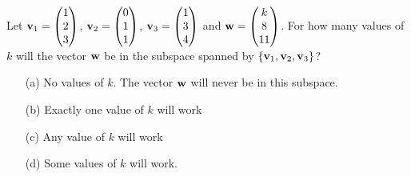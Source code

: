 \begin{problem}
    Let ${\bf v}_1 = \begin{pmatrix} 1 \\ 2 \\ 3 \end{pmatrix}$, ${\bf v}_2 = \begin{pmatrix} 0 \\
        1 \\ 1 \end{pmatrix}$, ${\bf v}_3 = \begin{pmatrix} 1 \\ 3 \\ 4 \end{pmatrix}$ and
            ${\bf w} = \begin{pmatrix} k \\ 8 \\ 11\end{pmatrix}$.  For how many values of $k$
                will the vector ${\bf w}$ be in the subspace spanned by
                $\{{\bf v}_1,{\bf v}_2,{\bf v}_3\}$?
    \begin{enumerate}
        \item[(a)] No values of $k$.  The vector ${\bf w}$ will never be in this subspace.
        \item[(b)] Exactly one value of $k$ will work
        \item[(c)] Any value of $k$ will work
        \item[(d)] Some values of $k$ will work.
    \end{enumerate}
\end{problem}

%         


